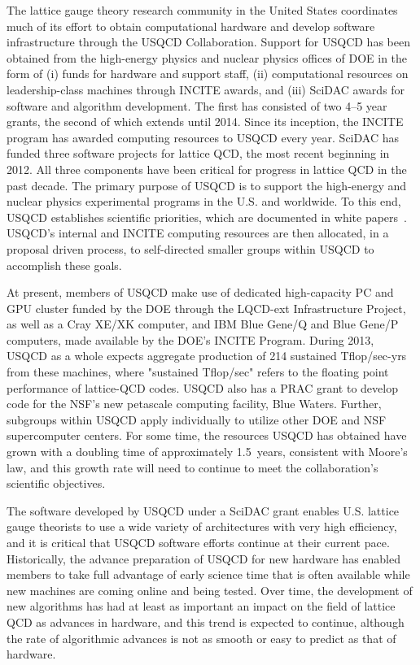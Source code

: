 The lattice gauge theory research community in the United States coordinates much of its effort to obtain
computational hardware and develop software infrastructure through the USQCD Collaboration.
Support for USQCD has been obtained from the high-energy physics and nuclear physics offices of DOE in the
form of (i) funds for hardware and support staff, (ii) computational resources on leadership-class machines
through INCITE awards, and (iii) SciDAC awards for software and algorithm development.
The first has consisted of two 4--5 year grants, the second of which extends until 2014.
Since its inception, the INCITE program has awarded computing resources to USQCD every year.
SciDAC has funded three software projects for lattice QCD, the most recent beginning in 2012.
All three components have been critical for progress in lattice QCD in the past decade.
The primary purpose of USQCD is to support the high-energy and nuclear physics experimental programs in the
U.S. and worldwide.
To this end, USQCD establishes scientific priorities, which are documented in white papers~\cite{USQCD_EF_whitepaper13,USQCD_IF_whitepaper13,USQCD_NP_whitepaper13,USQCD_Thermo_whitepaper13}.
USQCD's internal and INCITE computing resources are then allocated, in a proposal driven process, to
self-directed smaller groups within USQCD to accomplish these goals.

At present, members of USQCD make use of dedicated high-capacity PC and GPU cluster funded by the DOE through the LQCD-ext
Infrastructure Project, as well as a Cray XE/XK computer, and IBM Blue Gene/Q and Blue Gene/P computers, made
available by the DOE's INCITE Program.
During 2013, USQCD as a whole expects aggregate production of 214 sustained Tflop/sec-yrs from these machines, where "sustained Tflop/sec" refers to the floating point performance of lattice-QCD codes.
USQCD also has a PRAC grant to develop code for the NSF's new petascale computing facility, Blue Waters.
Further, subgroups within USQCD apply individually to utilize other DOE and NSF supercomputer centers.
For some time, the resources USQCD has obtained have grown with a doubling time of approximately 1.5~years,
consistent with Moore's law, and this growth rate will need to continue to meet the collaboration's scientific objectives.
 
The software developed by USQCD under a SciDAC grant enables U.S. lattice gauge theorists to use a wide variety
of architectures with very high efficiency, and it is critical that USQCD software efforts continue at their
current pace.
Historically, the advance preparation of USQCD for new hardware has enabled members to take full advantage of
early science time that is often available while new machines are coming online and being tested.
Over time, the development of new algorithms has had at least as important an impact on the field of lattice
QCD as advances in hardware, and this trend is expected to continue, although the rate of algorithmic
advances is not as smooth or easy to predict as that of hardware.

